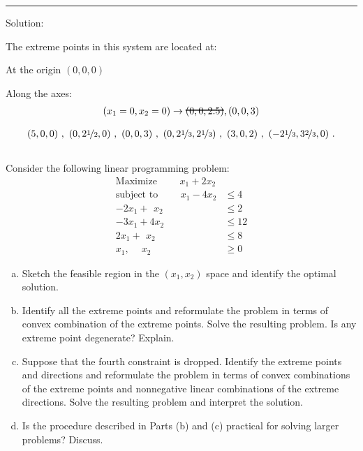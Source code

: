 \documentclass[12pt]{amsart}
\newcommand\hcancel[2][black]{\setbox0=\hbox{$#2$}%
	\rlap{\raisebox{.45\ht0}{\textcolor{#1}{\rule{\wd0}{1pt}}}}#2}
\begin{document}
\medskip \hrule \medskip
Solution:

The extreme points in this system are located at:

At the origin \((0,0,0)\)

Along the axes:
\begin{align*}
	(x_1=0,x_2=0) \rightarrow \hcancel{(0,0,2.5)}, (0,0,3)
\end{align*}

\begin{align*}
	(5,0,0)\ ,\
	(0,2\nicefrac{1}{2},0)\ ,\
	(0, 0, 3)\ ,\
	(0,2\nicefrac{1}{3},2\nicefrac{1}{3})\ ,\
	(3,0,2)\ ,\
	(-2\nicefrac{1}{3},3\nicefrac{2}{3},0)\ .
\end{align*}



\clearpage
\setcounter{section}{3}
\setcounter{subsection}{0}
\subsection{}
Consider the following linear programming problem:
\begin{align*}
	\text{Maximize }\qquad  x_1 + 2x_2 & \\
	\text{subject to }\qquad x_1 - 4x_2 &\leq 4 \\
 	-2x_1 +\,\ x_2 &\leq 2  \\ 
 	-3x_1 +   4x_2 &\leq 12 \\
	 2x_1 +\,\ x_2 &\leq 8  \\
	  x_1,\quad\   x_2 &\geq 0	  
\end{align*}

\begin{enumerate}[a.]
	\item 
	Sketch the feasible region in the \((x_1,x_2)\) space and identify the optimal solution.
	\item 
	Identify all the extreme points and reformulate the problem in terms of convex combination of the extreme points. 
	Solve the resulting problem. 
	Is any extreme point degenerate? Explain.
	\item 
	Suppose that the fourth constraint is dropped. Identify the extreme points and directions and reformulate the problem in terms of convex combinations of the extreme points and nonnegative linear combinations of the extreme directions. Solve the resulting problem and interpret the solution.
	\item 
	Is the procedure described in Parts (b) and (c) practical for solving larger problems? Discuss.
\end{enumerate}
\end{document}

